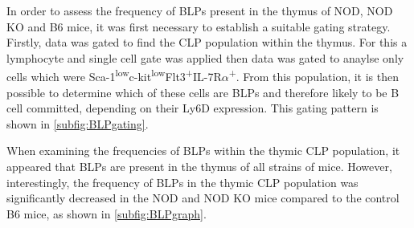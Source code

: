 	
	
	





In order to assess the frequency of BLPs present in the thymus of NOD, NOD KO and B6 mice, it was first necessary to establish a suitable gating strategy.
Firstly, data was gated to find the CLP population within the thymus.
For this a lymphocyte and single cell gate was applied then data was gated to anaylse only cells which were Sca-1\textsuperscript{low}c-kit\textsuperscript{low}Flt3\textsuperscript{+}IL-7R$\alpha$\textsuperscript{+}.
From this population, it is then possible to determine which of these cells are BLPs and therefore likely to be B cell committed, depending on their Ly6D expression.
This gating pattern is shown in \cref{subfig:BLPgating}.

When examining the frequencies of BLPs within the thymic CLP population, it appeared that BLPs are present in the thymus of all strains of mice.
However, interestingly, the frequency of BLPs in the thymic CLP population was significantly decreased in the NOD and NOD KO mice compared to the control B6 mice, as shown in \cref{subfig:BLPgraph}.

